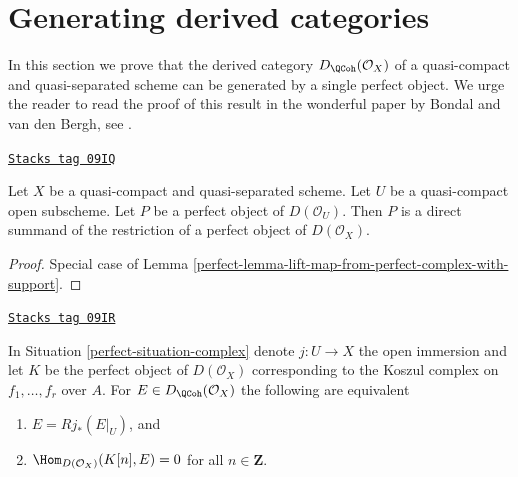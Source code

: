 \section{Generating derived categories}
\label{perfect-section-generating}
In this section we prove that the derived category
$D_\QCoh(\mathcal{O}_X)$ of a quasi-compact
and quasi-separated scheme can be generated by a single perfect object.
We urge the reader to read the proof of this result in the wonderful paper by
Bondal and van den Bergh, see \cite{BvdB}.

\begin{lemma}
\label{perfect-lemma-direct-summand-of-a-restriction}
\href{https://stacks.math.columbia.edu/tag/09IQ}{\texttt{Stacks tag 09IQ}}

Let $X$ be a quasi-compact and quasi-separated scheme.
Let $U$ be a quasi-compact open subscheme.
Let $P$ be a perfect object of $D(\mathcal{O}_U)$.
Then $P$ is a direct summand of the restriction of a perfect
object of $D(\mathcal{O}_X)$.
\end{lemma}

\begin{proof}

Special case of Lemma \ref{perfect-lemma-lift-map-from-perfect-complex-with-support}.
\end{proof}

\begin{lemma}
\label{perfect-lemma-orthogonal-koszul-complex}
\href{https://stacks.math.columbia.edu/tag/09IR}{\texttt{Stacks tag 09IR}}

\begin{reference}
\cite[Proposition 6.1]{Bokstedt-Neeman}
\end{reference}
In Situation \ref{perfect-situation-complex} denote $j : U \to X$ the open
immersion and let $K$ be the perfect object of $D(\mathcal{O}_X)$
corresponding to the Koszul complex on $f_1, \ldots, f_r$ over $A$.
For $E \in D_\QCoh(\mathcal{O}_X)$ the following are equivalent
\begin{enumerate}
\item $E = Rj_*(E|_U)$, and
\item $\Hom_{D(\mathcal{O}_X)}(K[n], E) = 0$ for all $n \in \mathbf{Z}$.
\end{enumerate}
\end{lemma}

